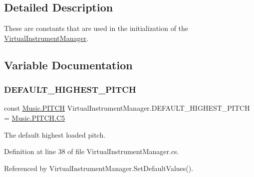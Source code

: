 \subsection{Detailed Description}
These are constants that are used in the initialization of the \hyperlink{class_virtual_instrument_manager}{Virtual\+Instrument\+Manager}. 

\subsection{Variable Documentation}
\mbox{\label{group___v_i_m_const_gadb93993bf989a9ac6e95be9e1561a5bb}} 
\subsubsection{\texorpdfstring{D\+E\+F\+A\+U\+L\+T\+\_\+\+H\+I\+G\+H\+E\+S\+T\+\_\+\+P\+I\+T\+CH}{DEFAULT\_HIGHEST\_PITCH}}
{\footnotesize\ttfamily const \hyperlink{group___music_enums_ga508f69b199ea518f935486c990edac1d}{Music.\+P\+I\+T\+CH} Virtual\+Instrument\+Manager.\+D\+E\+F\+A\+U\+L\+T\+\_\+\+H\+I\+G\+H\+E\+S\+T\+\_\+\+P\+I\+T\+CH = \hyperlink{group___music_enums_gga508f69b199ea518f935486c990edac1dafea813d4ddba3c46cf8b8e664b92cdaa}{Music.\+P\+I\+T\+C\+H.\+C5}\hspace{0.3cm}{\ttfamily [private]}}



The default highest loaded pitch. 



Definition at line 38 of file Virtual\+Instrument\+Manager.\+cs.



Referenced by Virtual\+Instrument\+Manager.\+Set\+Default\+Values().

\mbox{\label{group___v_i_m_const_gad74e35b317d6cc0bb57a78117fa430e6}} 
